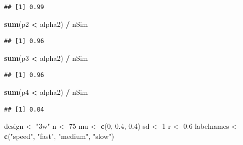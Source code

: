 \documentclass[]{book}
\newenvironment{Shaded}{\begin{snugshade}}{\end{snugshade}}
\newcommand{\DecValTok}[1]{\textcolor[rgb]{0.00,0.00,0.81}{#1}}
\newcommand{\FloatTok}[1]{\textcolor[rgb]{0.00,0.00,0.81}{#1}}
\newcommand{\KeywordTok}[1]{\textcolor[rgb]{0.13,0.29,0.53}{\textbf{#1}}}
\newcommand{\NormalTok}[1]{#1}
\newcommand{\OperatorTok}[1]{\textcolor[rgb]{0.81,0.36,0.00}{\textbf{#1}}}
\newcommand{\StringTok}[1]{\textcolor[rgb]{0.31,0.60,0.02}{#1}}
\begin{document}
\begin{verbatim}
## [1] 0.99
\end{verbatim}

\begin{Shaded}
\begin{Highlighting}[]
\KeywordTok{sum}\NormalTok{(p2 }\OperatorTok{<}\StringTok{ }\NormalTok{alpha2) }\OperatorTok{/}\StringTok{ }\NormalTok{nSim}
\end{Highlighting}
\end{Shaded}

\begin{verbatim}
## [1] 0.96
\end{verbatim}

\begin{Shaded}
\begin{Highlighting}[]
\KeywordTok{sum}\NormalTok{(p3 }\OperatorTok{<}\StringTok{ }\NormalTok{alpha2) }\OperatorTok{/}\StringTok{ }\NormalTok{nSim}
\end{Highlighting}
\end{Shaded}

\begin{verbatim}
## [1] 0.96
\end{verbatim}

\begin{Shaded}
\begin{Highlighting}[]
\KeywordTok{sum}\NormalTok{(p4 }\OperatorTok{<}\StringTok{ }\NormalTok{alpha2) }\OperatorTok{/}\StringTok{ }\NormalTok{nSim}
\end{Highlighting}
\end{Shaded}

\begin{verbatim}
## [1] 0.04
\end{verbatim}

\begin{Shaded}
\begin{Highlighting}[]
\NormalTok{design <-}\StringTok{ "3w"}
\NormalTok{n <-}\StringTok{ }\DecValTok{75}
\NormalTok{mu <-}\StringTok{ }\KeywordTok{c}\NormalTok{(}\DecValTok{0}\NormalTok{, }\FloatTok{0.4}\NormalTok{, }\FloatTok{0.4}\NormalTok{)}
\NormalTok{sd <-}\StringTok{ }\DecValTok{1}
\NormalTok{r <-}\StringTok{ }\FloatTok{0.6}
\NormalTok{labelnames <-}\StringTok{ }\KeywordTok{c}\NormalTok{(}\StringTok{"speed"}\NormalTok{, }\StringTok{"fast"}\NormalTok{, }\StringTok{"medium"}\NormalTok{, }\StringTok{"slow"}\NormalTok{)}
\end{Highlighting}
\end{Shaded}
\end{document}
